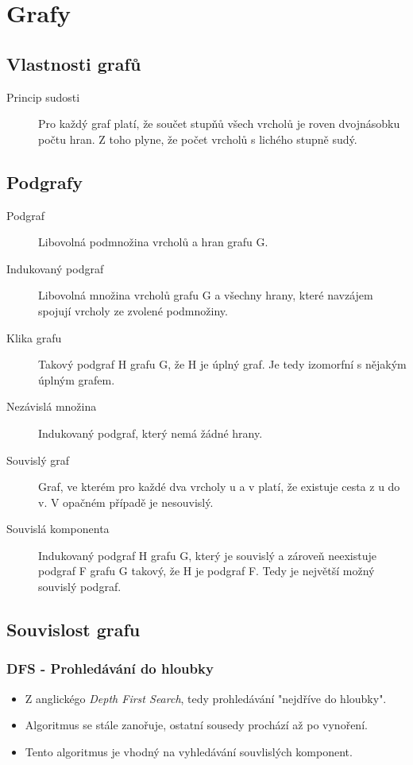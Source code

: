 \section{Grafy}

  \subsection{Vlastnosti grafů}
    \begin{description}
       \item[Princip sudosti] Pro každý graf platí, že součet stupňů všech vrcholů je roven dvojnásobku počtu hran. Z toho plyne, že počet vrcholů s lichého stupně sudý.
    \end{description}

  \subsection{Podgrafy}

    \begin{description}
      \item[Podgraf] Libovolná podmnožina vrcholů a hran grafu G.
      \item[Indukovaný podgraf] Libovolná množina vrcholů grafu G a všechny hrany, které navzájem spojují vrcholy ze zvolené podmnožiny.
      \item[Klika grafu] Takový podgraf H grafu G, že H je úplný graf. Je tedy izomorfní s nějakým úplným grafem.
      \item[Nezávislá množina] Indukovaný podgraf, který nemá žádné hrany.
      \item[Souvislý graf] Graf, ve kterém pro každé dva vrcholy u a v platí, že existuje cesta z u do v. V opačném případě je nesouvislý.
      \item[Souvislá komponenta] Indukovaný podgraf H grafu G, který je souvislý a zároveň neexistuje podgraf F grafu G takový, že H je podgraf F. Tedy je největší možný souvislý podgraf.
    \end{description}

  \subsection{Souvislost grafu}

    \subsubsection{DFS - Prohledávání do hloubky}
      \begin{itemize}
        \item Z anglickégo \emph{Depth First Search}, tedy prohledávání "nejdříve do hloubky".
        \item Algoritmus se stále zanořuje, ostatní sousedy prochází až po vynoření.
        \item Tento algoritmus je vhodný na vyhledávání souvlislých komponent.
      \end{itemize}

